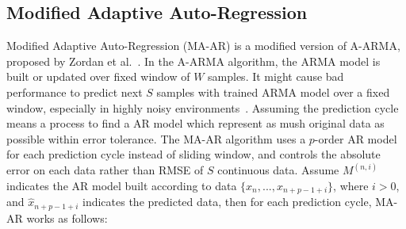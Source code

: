 
\subsection{Modified Adaptive Auto-Regression}

Modified Adaptive Auto-Regression (MA-AR) is a modified version of A-ARMA,
proposed by Zordan et al.~\cite{zordan2012compress}. In the A-ARMA algorithm,
the ARMA model is built or updated over fixed window of $W$ samples. It might
cause bad performance to predict next $S$ samples with trained ARMA model over a
fixed window, especially in highly noisy environments~\cite{zordan2012compress}.
Assuming the prediction cycle means a process to find a AR model which represent
as mush original data as possible within error tolerance. The MA-AR algorithm
uses a $p$-order AR model for each prediction cycle instead of sliding window,
and controls the absolute error on each data rather than RMSE of $S$ continuous
data. Assume $M^{(n, i)}$ indicates the AR model built according to data
$\{x_n, ..., x_{n+p-1+i} \}$, where $i>0$, and $\hat{x}_{n+p-1+i}$ indicates the
predicted data, then for each prediction cycle, MA-AR works as follows:

